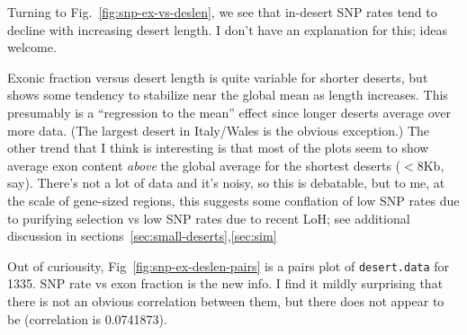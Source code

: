 \documentclass{article}\usepackage[]{graphicx}\usepackage[]{color}
\begin{document}
Turning to Fig.~\ref{fig:snp-ex-vs-deslen}, we see that in-desert SNP rates tend to decline with increasing desert
length.  I don't have an explanation for this; ideas welcome.

Exonic fraction versus desert length is quite variable for shorter deserts, but shows some tendency to stabilize near
the global mean as length increases.  This presumably is a ``regression to the mean'' effect since longer deserts
average over more data.  (The largest desert in Italy/Wales is the obvious exception.)  The other trend that I think is
interesting is that most of the plots seem to show average exon content \emph{above} the global average for the shortest
deserts ($< 8$Kb, say).  There's not a lot of data and it's noisy, so this is debatable, but to me, at the scale of
gene-sized regions, this suggests some conflation of low SNP rates due to purifying selection vs low SNP rates due to
recent LoH; see additional discussion in sections~\ref{sec:small-deserts},\ref{sec:sim}

Out of curiousity, Fig~\ref{fig:snp-ex-deslen-pairs} is a pairs plot of \texttt{desert.data} for 1335.  
SNP rate vs exon fraction is the new info.  I find it mildly surprising that there is not an obvious 
correlation between them, but there does not appear to be (correlation is 
0.0741873).
\end{document}
